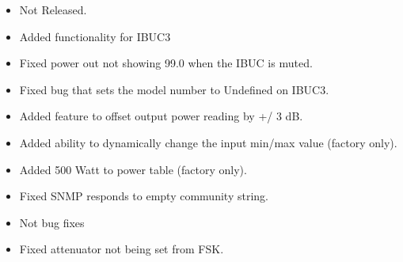 \documentclass[letterpaper,10pt,english]{sphinxhowto}
\begin{document}
\begin{description}
\begin{itemize}
\item {} 
\sphinxAtStartPar
Not Released.

\end{itemize}

\begin{itemize}
\item {} 
\sphinxAtStartPar
Added functionality for IBUC3

\item {} 
\sphinxAtStartPar
Fixed power out not showing \sphinxhyphen{}99.0 when the IBUC is muted.

\end{itemize}

\begin{itemize}
\item {} 
\sphinxAtStartPar
Fixed bug that sets the model number to Undeﬁned on IBUC3.

\end{itemize}

\begin{itemize}
\item {} 
\sphinxAtStartPar
Added feature to oﬀset output power reading by +/\sphinxhyphen{} 3 dB.

\item {} 
\sphinxAtStartPar
Added ability to dynamically change the input min/max value (factory only).

\item {} 
\sphinxAtStartPar
Added 500 Watt to power table (factory only).

\item {} 
\sphinxAtStartPar
Fixed SNMP responds to empty community string.

\end{itemize}

\begin{itemize}
\item {} 
\sphinxAtStartPar
Not bug ﬁxes

\end{itemize}

\begin{itemize}
\item {} 
\sphinxAtStartPar
Fixed attenuator not being set from FSK.

\end{itemize}


\end{description}
\end{document}
